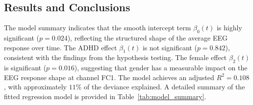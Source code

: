 \documentclass[twoside,11pt]{article}
\begin{document}
\subsection{Results and Conclusions}

The model summary indicates that the smooth intercept term $\beta_0(t)$ is highly significant ($p =
0.024$), reflecting the structured shape of the average EEG response over time. The ADHD effect
$\beta_1(t)$ is not significant ($p = 0.842$), consistent with the findings from the hypothesis
testing. The female effect $\beta_2(t)$ is significant ($p = 0.016$), suggesting that gender has a
measurable impact on the EEG response shape at channel FC1. The model achieves an adjusted $R^2 =
0.108$, with approximately $11\%$ of the deviance explained. A detailed summary of the fitted
regression model is provided in Table~\ref{tab:model_summary}.
\end{document}
